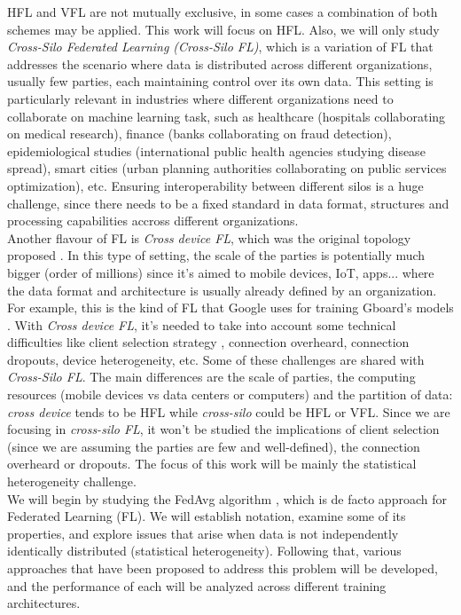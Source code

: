 HFL and VFL are not mutually exclusive, in some cases a combination of both schemes may be applied. This work will focus on HFL. Also, we will only study \textit{Cross-Silo Federated Learning (Cross-Silo FL)},
which is a variation of FL that addresses the scenario where data is distributed across different organizations, usually few parties, each maintaining control over its own data.
This setting is particularly relevant in industries where different organizations need to collaborate on machine learning task, such as healthcare (hospitals collaborating on medical research), finance (banks collaborating on fraud detection), epidemiological studies (international public health agencies studying disease spread),
smart cities (urban planning authorities collaborating on public services optimization), etc. Ensuring interoperability between different silos is a huge challenge, since there needs to be a fixed standard in data format, structures and processing capabilities accross different organizations.\\
Another flavour of FL is \textit{Cross device FL}, which was the original topology proposed \cite*{mcmahan2023a}. In this type of setting, the scale of the parties is potentially much bigger (order of millions) since it's aimed to mobile devices, IoT, apps... where the data format and architecture is usually already defined by an organization. For example, this is the kind of FL that Google uses for training Gboard's models \cite*{zhang2023}. With \textit{Cross device FL}, it's needed to take into account some technical difficulties like client selection strategy \cite*{smestad2023}, connection overheard, connection dropouts, device heterogeneity, etc.
Some of these challenges are shared with \textit{Cross-Silo FL}. The main differences are the scale of parties, the computing resources (mobile devices vs data centers or computers) and the partition of data: \textit{cross device} tends to be HFL while \textit{cross-silo} could be HFL or VFL. Since we are focusing in \textit{cross-silo FL}, it won't be studied the implications of client selection (since we are assuming the parties are few and well-defined), the connection overheard or dropouts. The focus of this work will be mainly the statistical heterogeneity challenge.\\
We will begin by studying the FedAvg algorithm \cite{mcmahan2023a}, which is de facto approach for Federated Learning (FL). We will establish notation, examine some of its properties, and explore issues that arise when data is not independently identically distributed (statistical heterogeneity). Following that, various approaches that have been proposed to address this problem will be developed, and the performance of each will be analyzed across different training architectures.

